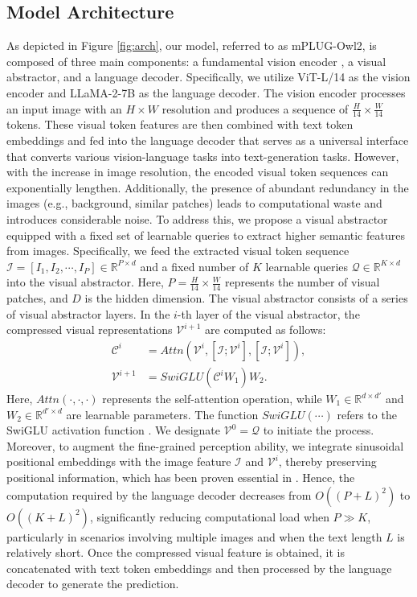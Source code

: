\documentclass[10pt,twocolumn,letterpaper]{article}
\newcommand{\modelname}{mPLUG-Owl2\xspace}
\begin{document}
\subsection{Model Architecture}\label{sec:arch}
As depicted in Figure \ref{fig:arch}, our model, referred to as \modelname, is composed of three main components: a fundamental vision encoder \cite{radford2021clip}, a visual abstractor, and a language decoder. Specifically, we utilize ViT-L/14 as the vision encoder and LLaMA-2-7B \cite{Touvron2023Llama2} as the language decoder. The vision encoder processes an input image with an $H\times W$ resolution and produces a sequence of $\frac{H}{14} \times \frac{W}{14}$ tokens. These visual token features are then combined with text token embeddings and fed into the language decoder that serves as a universal interface that converts various vision-language tasks into text-generation tasks. 
However, with the increase in image resolution, the encoded visual token sequences can exponentially lengthen. Additionally, the presence of abundant redundancy in the images (e.g., background, similar patches) leads to computational waste and introduces considerable noise. To address this, we propose a visual abstractor equipped with a fixed set of learnable queries to extract higher semantic features from images. Specifically, we feed the extracted visual token sequence $\mathcal{I} = [I_1, I_2, \cdots, I_P] \in \mathbb{R}^{P\times d}$ and a fixed number of $K$ learnable queries $\mathcal{Q} \in \mathbb{R}^{K\times d}$ into the visual abstractor. Here, $P=\frac{H}{14} \times \frac{W}{14}$ represents the number of visual patches, and $D$ is the hidden dimension. The visual abstractor consists of a series of visual abstractor layers. In the $i$-th layer of the visual abstractor, the compressed visual representations $\mathcal{V}^{i+1}$ are computed as follows:
\begin{align}
    \mathcal{C}^{i} &= Attn(\mathcal{V}^{i}, [\mathcal{I}; \mathcal{V}^{i}], [\mathcal{I}; \mathcal{V}^{i}]), \\
    \mathcal{V}^{i+1} &= SwiGLU(\mathcal{C}^{i}W_1)W_2.
\end{align}
Here, $Attn(\cdot, \cdot, \cdot)$ represents the self-attention operation, while $W_1 \in \mathbb{R}^{d\times d'}$ and $W_2 \in \mathbb{R}^{d'\times d}$ are learnable parameters. The function $SwiGLU(\cdots)$ refers to the SwiGLU activation function \cite{shazeer2020swiglu}. We designate $\mathcal{V}^{0} = \mathcal{Q}$ to initiate the process. Moreover, to augment the fine-grained perception ability, we integrate sinusoidal positional embeddings with the image feature $\mathcal{I}$ and $\mathcal{V}^{i}$, thereby preserving positional information, which has been proven essential in \cite{carion2020detr}. Hence, the computation required by the language decoder decreases from $O((P+L)^2)$ to $O((K+L)^2)$, significantly reducing computational load when $P \gg K$, particularly in scenarios involving multiple images and when the text length $L$ is relatively short. Once the compressed visual feature is obtained, it is concatenated with text token embeddings and then processed by the language decoder to generate the prediction.
\end{document}
